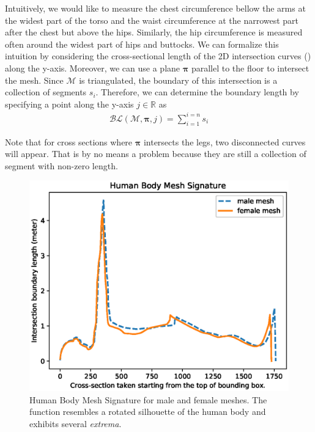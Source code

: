 \documentclass[10pt,twocolumn,letterpaper]{article}
\begin{document}
Intuitively, we would like to measure the chest circumference bellow the arms 
at the widest part of the torso and the waist circumference at the 
narrowest part after the chest but above the hips. Similarly, the hip 
circumference is measured often around the widest part of hips and buttocks. We 
can formalize this intuition by considering the cross-sectional length of the 
2D intersection curves (\cite{book.compu.topo}) along the y-axis. Moreover, we 
can 
use a plane $\boldsymbol{\pi}$ parallel to the floor to intersect the mesh. 
Since $\mathcal{M}$ is 
triangulated, the boundary of this 
intersection is a collection of segments $s_i$. Therefore, we can 
determine the boundary length by specifying a point along the y-axis $j \in 
\mathbb{R}$ as
\begin{align}
\mathcal{BL}(\mathcal{M}, \boldsymbol{\pi}, j) = \sum_{i = 
1}^{i = n}s_i
\end{align}

Note that for cross sections where $\boldsymbol{\pi}$ intersects the legs, two 
disconnected curves will appear. That is by no means a problem because they are 
still a collection of segment with non-zero length.

\begin{figure}[t]
	\begin{center}
		\includegraphics[width=\linewidth]{Figure_1.eps}
	\end{center}
	\caption{Human Body Mesh Signature for male and female meshes. The 
		function resembles a rotated silhouette of the human body and exhibits 
		several \textit{extrema}.}
	\label{fig:hbm_signature}
\end{figure}
\end{document}
